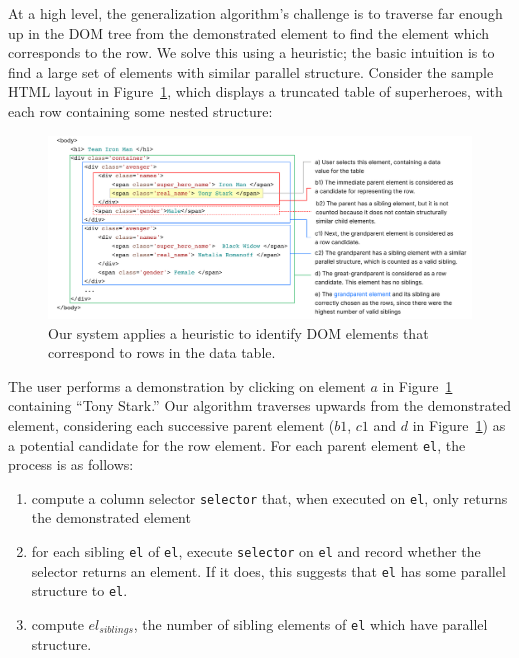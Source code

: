 \documentclass[sigconf,10pt]{acmart}
\providecommand{\tightlist}{%
  \setlength{\itemsep}{0pt}\setlength{\parskip}{0pt}}
\begin{document}
At a high level, the generalization algorithm's challenge is to traverse
far enough up in the DOM tree from the demonstrated element to find the
element which corresponds to the row. We solve this using a heuristic;
the basic intuition is to find a large set of elements with similar
parallel structure. Consider the sample HTML layout in
Figure~\ref{fig:algorithm}, which displays a truncated table of
superheroes, with each row containing some nested structure:

\begin{figure}
  \includegraphics[width=\textwidth]{media/algorithm.png}
  \caption{\label{fig:algorithm}Our system applies a heuristic to identify DOM elements that correspond to rows in the data table.}
\end{figure}

The user performs a demonstration by clicking on element \(a\) in
Figure~\ref{fig:algorithm} containing ``Tony Stark.'' Our algorithm
traverses upwards from the demonstrated element, considering each
successive parent element (\(b1\), \(c1\) and \(d\) in
Figure~\ref{fig:algorithm}) as a potential candidate for the row
element. For each parent element \texttt{el}, the process is as follows:

\begin{enumerate}
\def\labelenumi{\arabic{enumi}.}
\tightlist
\item
  compute a column selector \texttt{selector} that, when executed on
  \texttt{el}, only returns the demonstrated element
\item
  for each sibling \texttt{el\textquotesingle{}} of \texttt{el}, execute
  \texttt{selector} on \texttt{el\textquotesingle{}} and record whether
  the selector returns an element. If it does, this suggests that
  \texttt{el\textquotesingle{}} has some parallel structure to
  \texttt{el}.
\item
  compute \(el_{siblings}\), the number of sibling elements of
  \texttt{el} which have parallel structure.
\end{enumerate}
\end{document}
